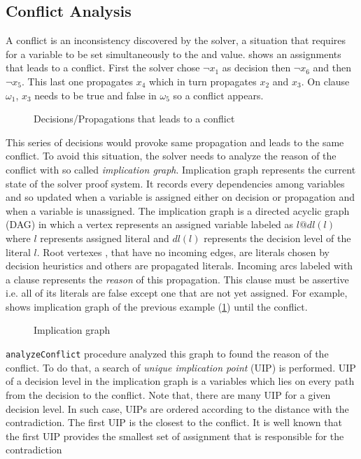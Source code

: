 

\subsection{Conflict Analysis}
A conflict is an inconsistency discovered by the solver, a situation that requires for a variable to be set 
simultaneously to the \true and \false value.  shows an assignments that leads to a conflict.
First the solver chose $\neg x_1$ as decision then $\neg x_6$ and then $\neg x_5$. This last one propagates $x_4$
which in turn propagates $x_2$ and $x_3$. On clause $\omega_1$, $x_3$ needs to be true and false in $\omega_5$ so
a conflict appears.

\begin{figure}[!htbp]
	\centering
		
	\caption{Decisions/Propagations that leads to a  conflict}
	\label{fig:conflict}
\end{figure}

This series of decisions would provoke same propagation and leads to the same conflict. To avoid this
situation, the solver needs to analyze the reason of the conflict with so called \emph{implication graph}.
Implication graph represents the current state of the solver proof system. It records every dependencies
among variables and so updated when a variable is assigned either on decision or propagation and when a variable
is unassigned. The implication graph is a directed acyclic graph (DAG) in which a vertex represents an assigned variable labeled as $l@dl(l)$ where $l$ represents assigned literal and $dl(l)$ represents the decision level of the literal $l$.
Root vertexes , that have no incoming edges, are literals chosen by decision heuristics and others are 
propagated literals.
Incoming arcs labeled with a clause represents the \emph{reason} of this propagation.
This clause must be assertive i.e. all of its literals are false except one that are not yet assigned.
For example,  shows implication graph of the previous example (\cref{fig:conflict}) until the conflict.

\begin{figure}[!htbp]
	\centering
	
	\caption{Implication graph}
	\label{fig:implication-graph}
\end{figure}


\texttt{analyzeConflict} procedure analyzed this graph to found the reason of the conflict. To do that, a search of
\emph{unique implication point} (UIP) is performed. UIP of a decision level in the implication graph is a variables
which lies on every path from the decision to the conflict. Note that, there are many UIP for a given decision level.
In such case, UIPs are ordered according to the distance with the contradiction. The first UIP is the closest to
the conflict. It is well known that the first UIP provides the smallest set of assignment that is responsible for the
contradiction~\cite{zhang2001efficient}

